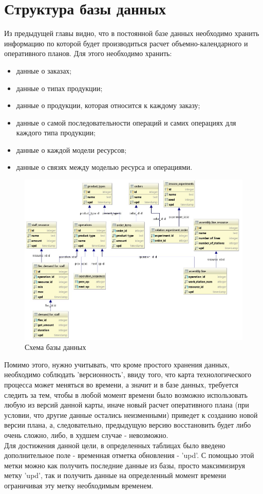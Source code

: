 \section*{Структура базы данных}

\indent Из предыдущей главы видно, что в постоянной базе данных необходимо хранить информацию по которой будет производиться расчет объемно-календарного и оперативного планов.
Для этого необходимо хранить:

\begin{itemize}
	\item данные о заказах;
	\item данные о типах продукции;
	\item данные о продукции, которая относится к каждому заказу;
	\item данные о самой последовательности операций и самих операциях для каждого типа продукции;
	\item данные о каждой модели ресурсов;
	\item данные о связях между моделью ресурса и операциями.
\end{itemize}

\begin{figure}[h]
	\includegraphics[width=\linewidth]{pics/databaseSchema.png}
	\caption{Схема базы данных}
	\label{fig:dbSchema}
	\centering
\end{figure}

\indent Помимо этого, нужно учитывать, что кроме простого хранения данных, необходимо соблюдать 'версионность', ввиду того, что карта технологического процесса может меняться во времени, а значит и в базе данных, требуется следить за тем, чтобы в любой момент времени было возможно использовать любую из версий данной карты, иначе новый расчет оперативного плана (при условии, что другие данные остались неизменными) приведет к созданию новой версии плана, а, следовательно, предыдущую версию восстановить будет либо очень сложно, либо, в худшем случае - невозможно.\\
\indent Для достижения данной цели, в определенных таблицах было введено дополнительное поле - временная отметка обновления - 'upd'.
С помощью этой метки можно как получить последние данные из базы, просто максимизируя метку 'upd', так и получить данные на определенный момент времени ограничивая эту метку необходимым временем.

